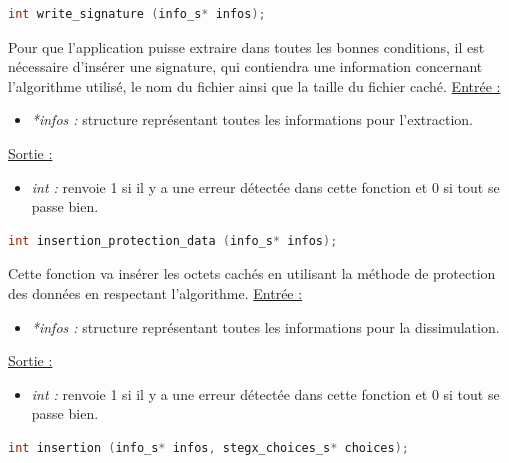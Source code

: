 \documentclass[11pt]{article}
\begin{document}
\begin{lstlisting}[language=c]
int write_signature (info_s* infos); 
\end{lstlisting}

Pour que l'application puisse extraire dans toutes les bonnes conditions, 
il est nécessaire d'insérer une signature, qui contiendra une information
concernant l'algorithme utilisé, le nom du fichier ainsi que la taille du 
fichier caché. 
\newline
\underline{Entrée :} 
\begin{itemize}
\item \textit{*infos :} structure représentant toutes les informations pour 
l'extraction. 
\end{itemize}
\underline{Sortie :} 
\begin{itemize}
\item \textit{int :} renvoie 1 si il y a une erreur détectée dans cette 
fonction et 0 si tout se passe bien.  
\newline 
\end{itemize}

\begin{lstlisting}[language=c]
int insertion_protection_data (info_s* infos); 
\end{lstlisting}

Cette fonction va insérer les octets cachés en utilisant la méthode 
de protection des données en respectant l'algorithme. 
\newline
\underline{Entrée :} 
\begin{itemize}
\item \textit{*infos :} structure représentant toutes les informations pour 
la dissimulation. 
\end{itemize}
\underline{Sortie :} 
\begin{itemize}
\item \textit{int :} renvoie 1 si il y a une erreur détectée dans cette 
fonction et 0 si tout se passe bien.  
\newline 
\end{itemize}

\begin{lstlisting}[language=c]
int insertion (info_s* infos, stegx_choices_s* choices); 
\end{lstlisting}
\end{document}
